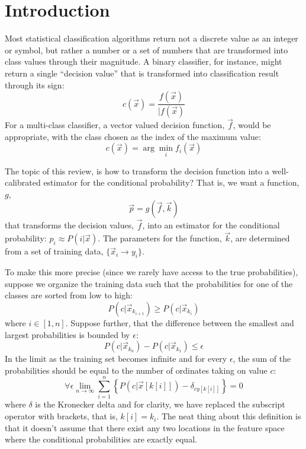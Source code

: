 \documentclass{article}
\newcommand{\classvalue}{c}
\newcommand{\binarydecision}{f}
\newcommand{\multidecision}{f}
\newcommand{\testpoint}{\vec x}
\newcommand{\transform}{g}
\newcommand{\param}{k}
\newcommand{\estimator}{{p}}
\newcommand{\condprob}{P}
\newcommand{\coord}{x}
\newcommand{\ord}{y}
\newcommand{\bound}{\epsilon}
\begin{document}
\section{Introduction}

Most statistical classification algorithms return not a discrete value as an 
integer or symbol, but rather a
number or a set of numbers that are transformed into class values through
their magnitude.
A binary classifier, for instance, might return a single ``decision value'' that
is transformed into classification result through its sign:
\begin{equation}
	\classvalue(\testpoint) = \frac{\binarydecision(\testpoint)}{|\binarydecision(\testpoint)}
\end{equation}
For a multi-class classifier, a vector valued decision function, 
$\vec \multidecision$, would be appropriate, with the class chosen as the
index of the maximum value:
\begin{equation}
	\classvalue(\testpoint) = \arg \min_i \multidecision_i (\vec x)
\end{equation}

The topic of this review, is how to transform the decision function into a
well-calibrated estimator for the conditional probability?
That is, we want a function, $\transform$,
\begin{equation}
  \vec \estimator = \transform(\vec \multidecision, \vec \param)
\end{equation}
that transforms the decision
values, $\vec \multidecision$, into an estimator for the conditional
probability: $\estimator_i \approx \condprob(i|\testpoint)$.
The parameters for the function, $\vec \param$, are determined from a set of 
training data, $\lbrace \vec \coord_i \rightarrow \ord_i \rbrace$.

To make this more precise (since we rarely have access to the true
probabilities), suppose we organize the training data such that
the probabilities for one of the classes are sorted from low to high:
\begin{equation}
	\condprob(c | \vec \coord_{k_{i+1}}) \ge \condprob(c | \vec \coord_{k_i})
\end{equation}
where $i\in[1, n]$.
Suppose further, that the difference between the smallest and largest
probabilities is bounded by $\bound$:
\begin{equation}
	\condprob(c | \vec \coord_{k_n}) - \condprob (c | \vec \coord_{k_1}) \le \bound
\end{equation}
In the limit as the training set becomes infinite and for every $\bound$,
the sum of the probabilities should be equal to the number of ordinates taking
on value $c$:
\begin{equation}
	\forall \bound \lim_{n \rightarrow \infty} \sum_{i=1}^n \left \lbrace \condprob \left (c | \vec \coord[k[i]] \right ) - \delta_{c\ord[k[i]]} \right \rbrace = 0
	\label{calibrated_definition}
\end{equation}
where $\delta$ is the Kronecker delta and for clarity, we have replaced the
subscript operator with brackets, that is, $k[i]=k_i$.
The neat thing about this definition is that it doesn't assume that there
exist any two locations in the feature space where the conditional
probabilities are exactly equal.
\end{document}
